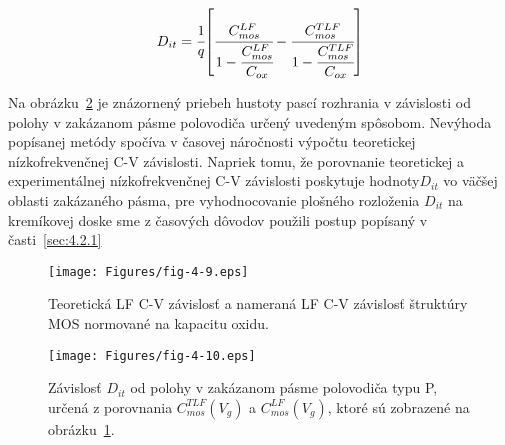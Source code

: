 \begin{equation}\label{eq:4.18}
  D_{it} = {\cfrac{1}{q}} {\left[\cfrac{C_{mos}^{LF}}{1-\cfrac{C_{mos}^{LF}}{C_{ox}}}-\cfrac{C_{mos}^{TLF}}{1-\cfrac{C_{mos}^{TLF}}{C_{ox}}}\right]}
\end{equation}

Na obrázku~\ref{fig:4.10} je znázornený priebeh hustoty pascí
rozhrania v závislosti od polohy v zakázanom pásme polovodiča určený
uvedeným spôsobom.  Nevýhoda popísanej metódy spočíva v časovej
náročnosti výpočtu teoretickej nízkofrekvenčnej C-V
závislosti. Napriek tomu, že porovnanie teoretickej a experimentálnej
nízkofrekvenčnej C-V závislosti poskytuje hodnoty$D_{it}$ vo väčšej
oblasti zakázaného pásma, pre vyhodnocovanie plošného rozloženia
$D_{it}$ na kremíkovej doske sme z časových dôvodov použili postup
popísaný v časti~\ref{sec:4.2.1}

\begin{figure}[h!]\centering
  \begin{minipage}[c]{\myfiguresize}
    \begin{center}
      \texttt{[image: Figures/fig-4-9.eps]}
      \caption[Teoretická LF C-V závislosť a nameraná LF C-V
        závislosť]{Teoretická LF C-V závislosť a nameraná LF C-V
        závislosť štruktúry MOS normované na kapacitu
        oxidu.}\label{fig:4.9}
    \end{center}
  \end{minipage}
\end{figure}

\begin{figure}[h!]\centering
  \begin{minipage}[c]{\myfiguresize}
    \begin{center}
      \texttt{[image: Figures/fig-4-10.eps]}
      \caption[Závislosť $D_{it}$ od polohy v zakázanom pásme
        polovodiča určená z porovnania $C_{mos}^{TLF}(V_{g})$ a
        $C_{mos}^{LF}(V_{g})$]{Závislosť $D_{it}$ od polohy v
        zakázanom pásme polovodiča typu P, určená z porovnania
        $C_{mos}^{TLF}(V_{g})$ a $C_{mos}^{LF}(V_{g})$, ktoré sú
        zobrazené na obrázku~\ref{fig:4.9}.}\label{fig:4.10}
    \end{center}
  \end{minipage}
\end{figure}


